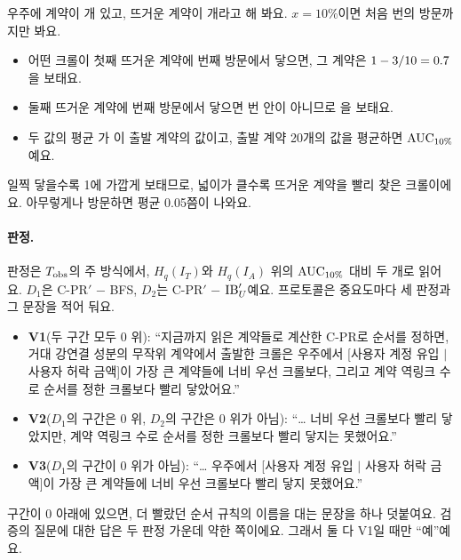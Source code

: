 \begin{puri}
우주에 계약이 개 있고, 뜨거운 계약이 개라고 해 봐요. $x=10\%$이면 처음 번의 방문까지만 봐요.
\begin{itemize}
\item 어떤 크롤이 첫째 뜨거운 계약에 번째 방문에서 닿으면, 그 계약은 $1-3/10=0.7$을 보태요.
\item 둘째 뜨거운 계약에 번째 방문에서 닿으면 번 안이 아니므로 을 보태요.
\item 두 값의 평균 가 이 출발 계약의 값이고, 출발 계약 20개의 값을 평균하면 $\mathrm{AUC}_{10\%}$예요.
\end{itemize}
일찍 닿을수록 1에 가깝게 보태므로, 넓이가 클수록 뜨거운 계약을 빨리 찾은 크롤이에요. 아무렇게나 방문하면 평균 0.05쯤이 나와요.
\end{puri}

\paragraph{판정.}
판정은 $T_{\mathrm{obs}}$의 주 방식에서, $H_q(I_T)$와 $H_q(I_A)$ 위의 $\mathrm{AUC}_{10\%}$ 대비 두 개로 읽어요. $D_1$은 C-PR$'$ − BFS, $D_2$는 C-PR$'$ − $\mathrm{IB}'_U$예요. 프로토콜은 중요도마다 세 판정과 그 문장을 적어 둬요.
\begin{itemize}
\item \textbf{V1}(두 구간 모두 0 위): “지금까지 읽은 계약들로 계산한 C-PR로 순서를 정하면, 거대 강연결 성분의 무작위 계약에서 출발한 크롤은 우주에서 [사용자 계정 유입 $|$ 사용자 허락 금액]이 가장 큰 계약들에 너비 우선 크롤보다, 그리고 계약 역링크 수로 순서를 정한 크롤보다 빨리 닿았어요.”
\item \textbf{V2}($D_1$의 구간은 0 위, $D_2$의 구간은 0 위가 아님): “… 너비 우선 크롤보다 빨리 닿았지만, 계약 역링크 수로 순서를 정한 크롤보다 빨리 닿지는 못했어요.”
\item \textbf{V3}($D_1$의 구간이 0 위가 아님): “… 우주에서 [사용자 계정 유입 $|$ 사용자 허락 금액]이 가장 큰 계약들에 너비 우선 크롤보다 빨리 닿지 못했어요.”
\end{itemize}
구간이 0 아래에 있으면, 더 빨랐던 순서 규칙의 이름을 대는 문장을 하나 덧붙여요. 검증의 질문에 대한 답은 두 판정 가운데 약한 쪽이에요. 그래서 둘 다 V1일 때만 “예”예요.

